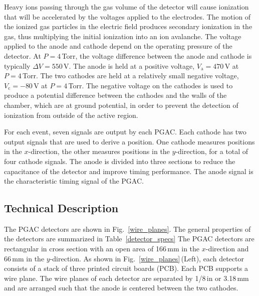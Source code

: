 Heavy ions passing through the gas volume of the detector will cause ionization that will be accelerated by the %
 voltages applied to the electrodes.  The motion of the ionized gas particles in the electric field produces secondary ionization in the gas, thus multiplying the initial ionization into an ion avalanche.
The  voltage applied to the anode and cathode depend on the operating pressure of the detector.  At $P=4$\,Torr, the voltage difference between the anode and cathode is typically $\Delta V=550$\,V.  The anode is held at a positive voltage, $V_\textrm{a}=470$\,V at $P=4$\,Torr.  The two cathodes are held at a relatively small negative voltage, $V_\textrm{c}=-80$\,V at $P=4$\,Torr.  The negative voltage on the cathodes is used to produce a potential difference between the cathodes and the walls of the chamber, which are at ground potential, in order to prevent the detection of ionization from outside of the active region.  

For each event, seven signals are output by each PGAC. Each cathode has two output signals that are used to derive a position.  One cathode measures positions in the $x$-direction, the other measures positions in the $y$-direction, for a total of four cathode signals.  The anode is divided into three sections to reduce the capacitance of the detector and improve timing performance.  The anode signal is the characteristic timing signal of the PGAC.%


\subsection{Technical Description}
The PGAC detectors are shown in Fig.~\ref{wire_planes}.
The general properties of the detectors are summarized in Table~\ref{detector_specs}  
The PGAC detectors are rectangular in cross section with %
an open area of 166\,mm in the $x$-direction and 66\,mm in the $y$-direction.  
As shown in Fig.~\ref{wire_planes}\,(Left), each detector consists of a stack of three printed circuit boards (PCB).  Each PCB supports a wire plane.  The wire planes of each detector are separated by 1/8\,in or 3.18\,mm and are arranged such that the anode is centered between the two cathodes.

